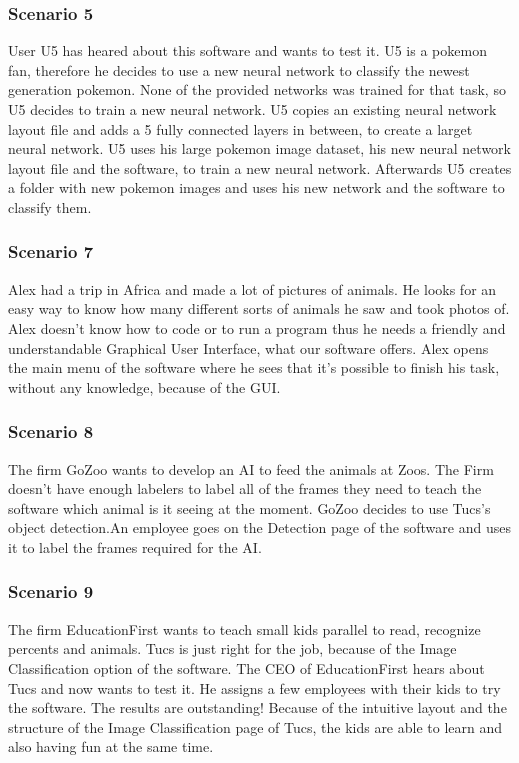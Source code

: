 \documentclass[parskip=full]{scrartcl}
\begin{document}
\subsubsection{Scenario 5}
User U5 has heared about this software and wants to test it.
U5 is a pokemon fan, therefore he decides to use a new neural network to classify the newest generation pokemon. None of the provided networks was trained for that task, so U5 decides to train a new neural network. U5 copies an existing neural network layout file and adds a 5 fully connected layers in between, to create a larget neural network. U5 uses his large pokemon image dataset, his new neural network layout file and the software, to train a new neural network. 
Afterwards U5 creates a folder with new pokemon images and uses his new network and the software to classify them.
\subsubsection{Scenario 7}
Alex had a trip in Africa and made a lot of pictures of animals. He looks for an easy way to know how many different sorts of animals he saw and took photos of. Alex doesn't know how to code or to run a program thus he needs a friendly and understandable Graphical User Interface, what our software offers. Alex opens the main menu of the software where he sees that it's possible to finish his task, without any knowledge, because of the GUI. 
\subsubsection{Scenario 8}
The firm GoZoo wants to develop an AI to feed the animals at Zoos. The Firm doesn't have enough labelers to label all of the frames they need to teach the software which animal is it seeing at the moment. GoZoo decides to use Tucs's object detection.An employee goes on the Detection page of the software and uses it to label the frames required for the AI.
\clearpage
\subsubsection{Scenario 9}
The firm EducationFirst wants to teach small kids parallel to read, recognize percents and animals. Tucs is just right for the job, because of the Image Classification option of the software. The CEO of EducationFirst hears about Tucs and now wants to test it. He assigns a few employees with their kids to try the software. The results are outstanding! Because of the intuitive layout and the structure of the Image Classification page of Tucs, the kids are able to learn and also having fun at the same time.
\clearpage
\end{document}
